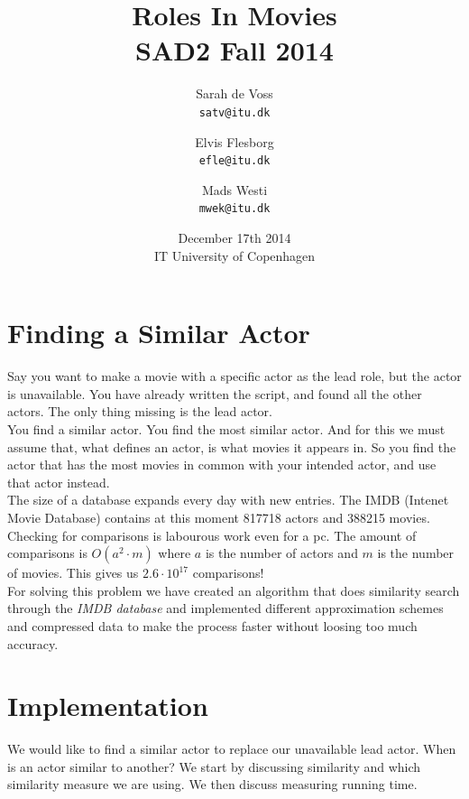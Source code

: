 \documentclass[a4paper,11pt]{article}
\begin{document}
\setlength{\parindent}{0cm}
\setlength{\unitlength}{1mm}
\date{December 17th 2014\\ IT University of Copenhagen}
\title{Roles In Movies\\SAD2 Fall 2014}

\author{Sarah de Voss\\
\texttt{satv@itu.dk}
\and Elvis Flesborg\\
\texttt{efle@itu.dk}
\and Mads Westi\\
\texttt{mwek@itu.dk}}
\clearpage\maketitle

\thispagestyle{empty}
\newpage
\tableofcontents
\thispagestyle{empty}
\newpage

\setcounter{page}{1}
\section{Finding a Similar Actor}

Say you want to make a movie with a specific actor as the lead role, but the actor is unavailable. You have already written the script, and found all the other actors. The only thing missing is the lead actor. \\

You find a similar actor. You find the most similar actor. And for this we must assume that, what defines an actor, is what movies it appears in. So you find the actor that has the most movies in common with your intended actor, and use that actor instead. \\

The size of a database expands every day with new entries. The IMDB (Intenet Movie Database) contains at this moment 817718 actors and 388215 movies. Checking for comparisons is labourous work even for a pc. The amount of comparisons is $O(a^2\cdot m)$ where $a$ is the number of actors and $m$ is the number of movies. This gives us $2.6\cdot 10^{17}$ comparisons!\\

For solving this problem we have created an algorithm that does similarity search through the \emph{IMDB database} and implemented different approximation schemes and compressed data to make the process faster without loosing too much accuracy.


\section{Implementation}
We would like to find a similar actor to replace our unavailable lead actor. When is an actor similar to another? We start by discussing similarity and which similarity measure we are using. We then discuss measuring running time.\\
\end{document}

